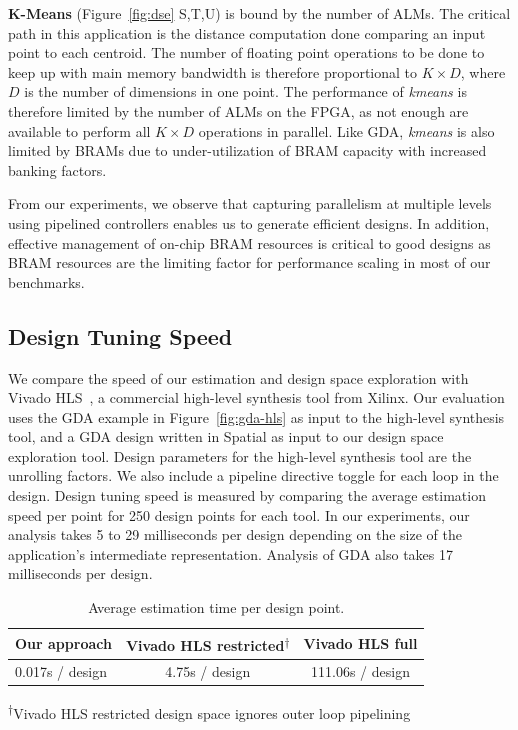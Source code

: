 \textbf{K-Means} (Figure~\ref{fig:dse} S,T,U) is bound by the number of ALMs. The critical path in this application is the distance computation done comparing an input point to each centroid.
The number of floating point operations to be done to keep up with main memory bandwidth is therefore proportional to $K \times D$, where $D$ is the number of dimensions in one point.
The performance of \emph{kmeans} is therefore limited by the number of ALMs on the FPGA, as not enough are available to perform all $K \times D$ operations in parallel.
Like GDA, \emph{kmeans} is also limited by BRAMs due to under-utilization of BRAM capacity with increased banking factors.

From our experiments, we observe that capturing parallelism at multiple levels using pipelined controllers enables us to generate
efficient designs. In addition, effective management of on-chip BRAM resources is critical to good designs
as BRAM resources are the limiting factor for performance scaling in most of our benchmarks.

\subsection{Design Tuning Speed}
We compare the speed of our estimation and design space exploration with
Vivado HLS~\cite{vivadohls}, a commercial high-level synthesis tool from Xilinx.
Our evaluation uses the GDA example in Figure~\ref{fig:gda-hls} as input to the high-level synthesis tool, and a GDA design written in Spatial as input to our design space exploration tool. Design parameters
for the high-level synthesis tool are the unrolling factors. We also include a pipeline directive
toggle for each loop in the design. Design tuning speed
is measured by comparing the average estimation speed per point for 250 design points for each tool.
In our experiments, our analysis takes 5 to 29 milliseconds per design depending on the size of the application's intermediate representation. Analysis of GDA also takes 17 milliseconds per design.

\begin{table}
\centering\footnotesize
\begin{tabular}{lcc}
\toprule
{\bf Our approach}  & {\bf Vivado HLS restricted\textsuperscript{$\dagger$}} & {\bf Vivado HLS full} \\ \midrule
0.017s / design     & 4.75s / design               & 111.06s / design      \\ \midrule
\end{tabular}

\vspace{5pt}
\textsuperscript{$\dagger$}Vivado HLS restricted design space ignores outer loop pipelining
\caption{Average estimation time per design point.}
\label{t:speeds}
\end{table}

